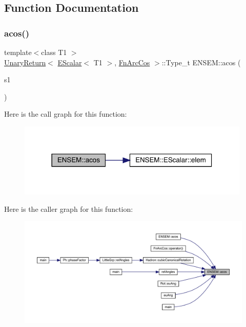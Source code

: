 \subsection{Function Documentation}
\mbox{\label{group__escalar_gac8e90d16773622bd9971db55f0c125c9}} 
\subsubsection{\texorpdfstring{acos()}{acos()}}
{\footnotesize\ttfamily template$<$class T1 $>$ \\
\mbox{\hyperlink{structENSEM_1_1UnaryReturn}{Unary\+Return}}$<$ \mbox{\hyperlink{classENSEM_1_1EScalar}{E\+Scalar}}$<$ T1 $>$, \mbox{\hyperlink{structENSEM_1_1FnArcCos}{Fn\+Arc\+Cos}} $>$\+::Type\+\_\+t E\+N\+S\+E\+M\+::acos (\begin{DoxyParamCaption}\item[{const \mbox{\hyperlink{classENSEM_1_1EScalar}{E\+Scalar}}$<$ T1 $>$ \&}]{s1 }\end{DoxyParamCaption})\hspace{0.3cm}{\ttfamily [inline]}}

Here is the call graph for this function\+:\nopagebreak
\begin{figure}[H]
\begin{center}
\leavevmode
\includegraphics[width=314pt]{d4/dca/group__escalar_gac8e90d16773622bd9971db55f0c125c9_cgraph}
\end{center}
\end{figure}
Here is the caller graph for this function\+:
\nopagebreak
\begin{figure}[H]
\begin{center}
\leavevmode
\includegraphics[width=350pt]{d4/dca/group__escalar_gac8e90d16773622bd9971db55f0c125c9_icgraph}
\end{center}
\end{figure}
\mbox{\label{group__escalar_ga51071562edd203962f48e4b44f0c0a0c}} 
